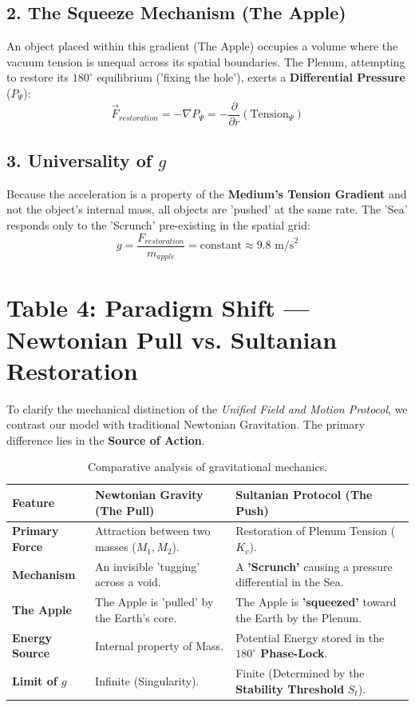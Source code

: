\documentclass[11pt]{article}
\begin{document}
\subsection*{2. The Squeeze Mechanism (The Apple)}
An object placed within this gradient (The Apple) occupies a volume where the vacuum tension is unequal across its spatial boundaries. The Plenum, attempting to restore its $180^\circ$ equilibrium ('fixing the hole'), exerts a \textbf{Differential Pressure} ($P_{\Psi}$):
\begin{equation}
    \vec{F}_{restoration} = -\nabla P_{\Psi} = -\frac{\partial}{\partial r} \left( \text{Tension}_{\Psi} \right)
\end{equation}

\subsection*{3. Universality of $g$}
Because the acceleration is a property of the \textbf{Medium's Tension Gradient} and not the object's internal mass, all objects are 'pushed' at the same rate. The 'Sea' responds only to the 'Scrunch' pre-existing in the spatial grid:
\begin{equation}
    g = \frac{F_{restoration}}{m_{apple}} = \text{constant} \approx 9.8 \text{ m/s}^2
\end{equation}


\section*{Table 4: Paradigm Shift — Newtonian Pull vs. Sultanian Restoration}

To clarify the mechanical distinction of the \textit{Unified Field and Motion Protocol}, we contrast our model with traditional Newtonian Gravitation. The primary difference lies in the \textbf{Source of Action}.

\begin{table}[h!]
\centering
\renewcommand{\arraystretch}{1.5}
\begin{tabular}{|l|p{5cm}|p{5cm}|}
\hline
\textbf{Feature} & \textbf{Newtonian Gravity (The Pull)} & \textbf{Sultanian Protocol (The Push)} \\ \hline
\textbf{Primary Force} & Attraction between two masses ($M_1, M_2$). & Restoration of Plenum Tension ($K_v$). \\ \hline
\textbf{Mechanism} & An invisible 'tugging' across a void. & A \textbf{'Scrunch'} causing a pressure differential in the Sea. \\ \hline
\textbf{The Apple} & The Apple is 'pulled' by the Earth's core. & The Apple is \textbf{'squeezed'} toward the Earth by the Plenum. \\ \hline
\textbf{Energy Source} & Internal property of Mass. & Potential Energy stored in the \textbf{$180^\circ$ Phase-Lock}. \\ \hline
\textbf{Limit of $g$} & Infinite (Singularity). & Finite (Determined by the \textbf{Stability Threshold} $S_t$). \\ \hline
\end{tabular}
\caption{Comparative analysis of gravitational mechanics.}
\end{table}
\end{document}
